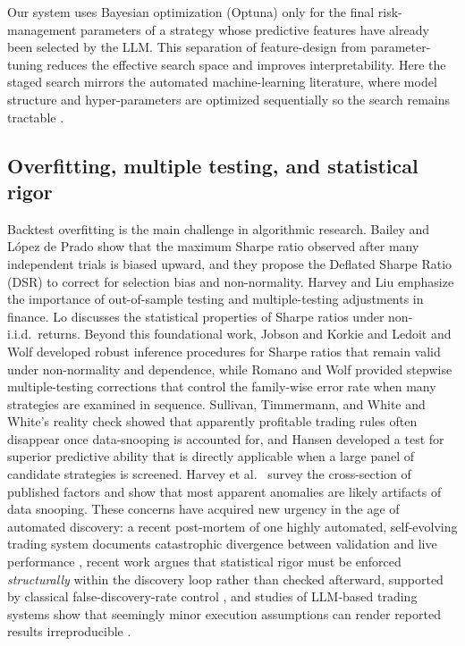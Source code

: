 \documentclass[11pt,a4paper]{article}
\begin{document}
Our system uses Bayesian optimization (Optuna) only for the final risk-management parameters of a strategy whose predictive features have already been selected by the LLM. This separation of feature-design from parameter-tuning reduces the effective search space and improves interpretability. Here the staged search mirrors the automated machine-learning literature, where model structure and hyper-parameters are optimized sequentially so the search remains tractable \citep{hutter_2019}.

\subsection{Overfitting, multiple testing, and statistical rigor}\label{overfitting-multiple-testing-and-statistical-rigor}

Backtest overfitting is the main challenge in algorithmic research. Bailey and L\'{o}pez de Prado \citep{bailey_2014} show that the maximum Sharpe ratio observed after many independent trials is biased upward, and they propose the Deflated Sharpe Ratio (DSR) to correct for selection bias and non-normality. Harvey and Liu \citep{harvey_2015} emphasize the importance of out-of-sample testing and multiple-testing adjustments in finance. Lo \citep{lo_2002} discusses the statistical properties of Sharpe ratios under non-i.i.d.~returns. Beyond this foundational work, Jobson and Korkie \citep{jobson_1981} and Ledoit and Wolf \citep{ledoit_2008} developed robust inference procedures for Sharpe ratios that remain valid under non-normality and dependence, while Romano and Wolf \citep{romano_2005} provided stepwise multiple-testing corrections that control the family-wise error rate when many strategies are examined in sequence. Sullivan, Timmermann, and White \citep{sullivan_1999, sullivan_2001} and White's \citep{white_2000} reality check showed that apparently profitable trading rules often disappear once data-snooping is accounted for, and Hansen \citep{hansen_2005} developed a test for superior predictive ability that is directly applicable when a large panel of candidate strategies is screened. Harvey et al.~\citep{harvey_2016} survey the cross-section of published factors and show that most apparent anomalies are likely artifacts of data snooping. These concerns have acquired new urgency in the age of automated discovery: a recent post-mortem of one highly automated, self-evolving trading system documents catastrophic divergence between validation and live performance \citep{chen_2025_redqueen}, recent work argues that statistical rigor must be enforced \emph{structurally} within the discovery loop rather than checked afterward, supported by classical false-discovery-rate control \citep{benjamini_hochberg_1995}, and studies of LLM-based trading systems show that seemingly minor execution assumptions can render reported results irreproducible \citep{yao_zheng_2026}.
\end{document}
